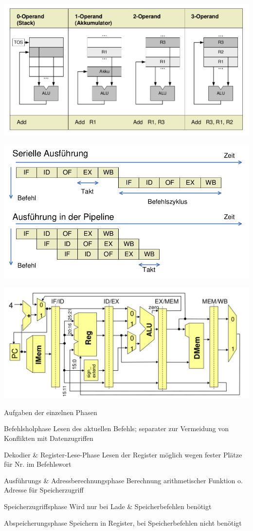 \documentclass[10pt,landscape]{article}
\begin{document}
\begin{multicols}{3}
  \includegraphics[width=\textwidth/4]{Assets/RA2_Operanden.png}
  
  \includegraphics[width=\textwidth/4]{Assets/RA2_pipelineCPU.png}
  
  \includegraphics[width=\textwidth/4]{Assets/RA2_mehrzyklenCPU.png}
  
  Aufgaben der einzelnen Phasen
  \begin{description*}
    \item[Befehlsholphase] Lesen des aktuellen Befehls; separater zur Vermeidung von Konflikten mit Datenzugriffen
    \item[Dekodier \& Register-Lese-Phase] Lesen der Register möglich wegen fester Plätze für Nr. im Befehlswort
    \item[Ausführungs \& Adressberechnungsphase] Berechnung arithmetischer Funktion o. Adresse für Speicherzugriff
    \item[Speicherzugriffsphase] Wird nur bei Lade \& Speicherbefehlen benötigt
    \item[Abspeicherungsphase] Speichern in Register, bei Speicherbefehlen nicht benötigt
  \end{description*}
  

\end{multicols}
\end{document}
